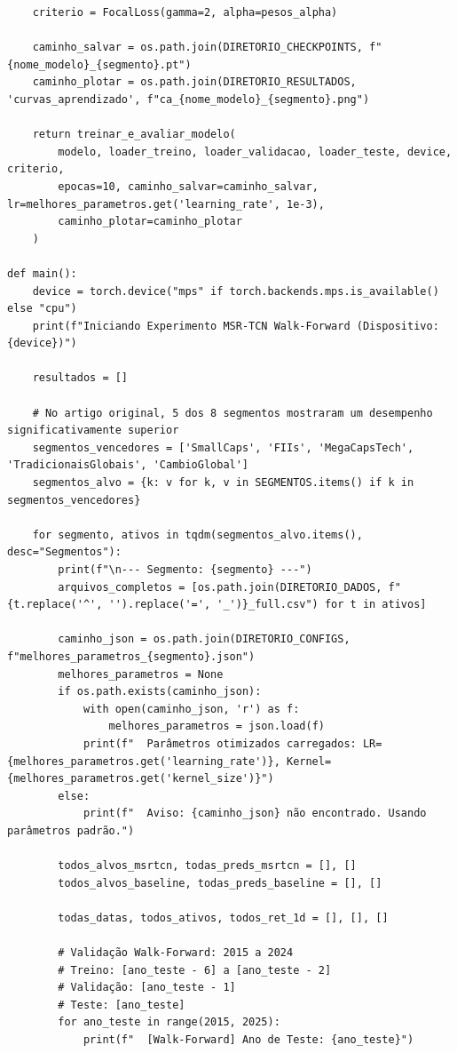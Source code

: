 \documentclass{article}
\begin{document}
\begin{verbatim}
    criterio = FocalLoss(gamma=2, alpha=pesos_alpha)
    
    caminho_salvar = os.path.join(DIRETORIO_CHECKPOINTS, f"{nome_modelo}_{segmento}.pt")
    caminho_plotar = os.path.join(DIRETORIO_RESULTADOS, 'curvas_aprendizado', f"ca_{nome_modelo}_{segmento}.png")
    
    return treinar_e_avaliar_modelo(
        modelo, loader_treino, loader_validacao, loader_teste, device, criterio, 
        epocas=10, caminho_salvar=caminho_salvar, lr=melhores_parametros.get('learning_rate', 1e-3),
        caminho_plotar=caminho_plotar
    )

def main():
    device = torch.device("mps" if torch.backends.mps.is_available() else "cpu")
    print(f"Iniciando Experimento MSR-TCN Walk-Forward (Dispositivo: {device})")
    
    resultados = []
    
    # No artigo original, 5 dos 8 segmentos mostraram um desempenho significativamente superior
    segmentos_vencedores = ['SmallCaps', 'FIIs', 'MegaCapsTech', 'TradicionaisGlobais', 'CambioGlobal']
    segmentos_alvo = {k: v for k, v in SEGMENTOS.items() if k in segmentos_vencedores}
    
    for segmento, ativos in tqdm(segmentos_alvo.items(), desc="Segmentos"):
        print(f"\n--- Segmento: {segmento} ---")
        arquivos_completos = [os.path.join(DIRETORIO_DADOS, f"{t.replace('^', '').replace('=', '_')}_full.csv") for t in ativos]
        
        caminho_json = os.path.join(DIRETORIO_CONFIGS, f"melhores_parametros_{segmento}.json")
        melhores_parametros = None
        if os.path.exists(caminho_json):
            with open(caminho_json, 'r') as f:
                melhores_parametros = json.load(f)
            print(f"  Parâmetros otimizados carregados: LR={melhores_parametros.get('learning_rate')}, Kernel={melhores_parametros.get('kernel_size')}")
        else:
            print(f"  Aviso: {caminho_json} não encontrado. Usando parâmetros padrão.")
            
        todos_alvos_msrtcn, todas_preds_msrtcn = [], []
        todos_alvos_baseline, todas_preds_baseline = [], []
        
        todas_datas, todos_ativos, todos_ret_1d = [], [], []
        
        # Validação Walk-Forward: 2015 a 2024
        # Treino: [ano_teste - 6] a [ano_teste - 2]
        # Validação: [ano_teste - 1]
        # Teste: [ano_teste]
        for ano_teste in range(2015, 2025):
            print(f"  [Walk-Forward] Ano de Teste: {ano_teste}")
            

\end{verbatim}
\end{document}
